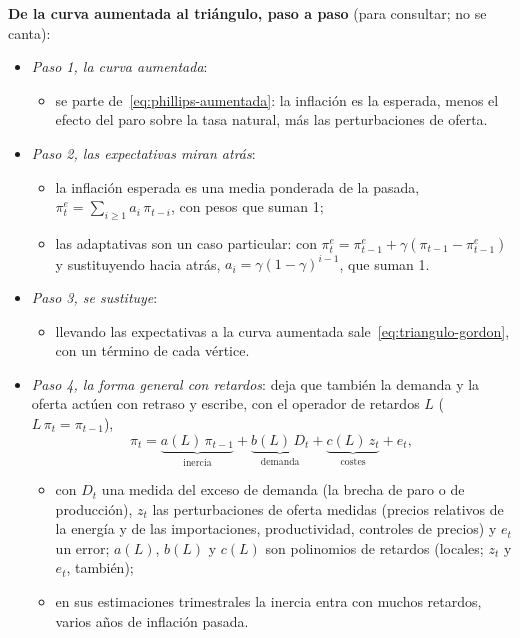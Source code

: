 \documentclass[11pt]{article}
\begin{document}
\begin{anotaciones}
\textbf{De la curva aumentada al triángulo, paso a paso} (para consultar; no se canta):
\begin{itemize}
\item \emph{Paso 1, la curva aumentada}:
  \begin{itemize}
  \item se parte de~\eqref{eq:phillips-aumentada}: la inflación es la esperada, menos el efecto del paro sobre la tasa natural, más las perturbaciones de oferta.
  \end{itemize}
\item \emph{Paso 2, las expectativas miran atrás}:
  \begin{itemize}
  \item la inflación esperada es una media ponderada de la pasada, $\pi^e_t=\sum_{i\geq1}a_i\,\pi_{t-i}$, con pesos que suman 1;
  \item las adaptativas son un caso particular: con $\pi^e_t=\pi^e_{t-1}+\gamma(\pi_{t-1}-\pi^e_{t-1})$ y sustituyendo hacia atrás, $a_i=\gamma(1-\gamma)^{i-1}$, que suman 1.
  \end{itemize}
\item \emph{Paso 3, se sustituye}:
  \begin{itemize}
  \item llevando las expectativas a la curva aumentada sale~\eqref{eq:triangulo-gordon}, con un término de cada vértice.
  \end{itemize}
\item \emph{Paso 4, la forma general con retardos}:  deja que también la demanda y la oferta actúen con retraso y escribe, con el operador de retardos $L$ ($L\,\pi_t=\pi_{t-1}$),
  \begin{equation*}
  \pi_t=\underbrace{a(L)\,\pi_{t-1}}_{\text{inercia}}+\underbrace{b(L)\,D_t}_{\text{demanda}}+\underbrace{c(L)\,z_t}_{\text{costes}}+e_t ,
  \end{equation*}
  \begin{itemize}
  \item con $D_t$ una medida del exceso de demanda (la brecha de paro o de producción), $z_t$ las perturbaciones de oferta medidas (precios relativos de la energía y de las importaciones, productividad, controles de precios) y $e_t$ un error; $a(L)$, $b(L)$ y $c(L)$ son polinomios de retardos (locales; $z_t$ y $e_t$, también);
  \item en sus estimaciones trimestrales la inercia entra con muchos retardos, varios años de inflación pasada.

\end{itemize}
\end{itemize}
\end{anotaciones}
\end{document}
